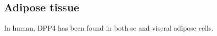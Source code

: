 \subsection{Adipose tissue}
In human, DPP4 has been found in both sc and viseral adipose cells.~\cite{Lamers2011} 